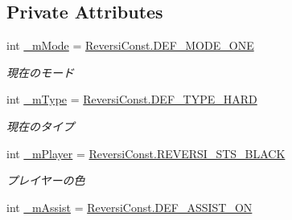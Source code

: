 \subsection*{Private Attributes}
\begin{DoxyCompactItemize}
\item 
\mbox{\label{class_reversi_form_1_1_reversi_setting_a054880d4b6b1dc2e0432d82671041c19}} 
int \hyperlink{class_reversi_form_1_1_reversi_setting_a054880d4b6b1dc2e0432d82671041c19}{\+\_\+m\+Mode} = \hyperlink{class_reversi_form_1_1_reversi_const_a1435eab18ee3e90aaaf9ec5f1efb2d90}{Reversi\+Const.\+D\+E\+F\+\_\+\+M\+O\+D\+E\+\_\+\+O\+NE}
\begin{DoxyCompactList}\small\item\em 現在のモード \end{DoxyCompactList}\item 
\mbox{\label{class_reversi_form_1_1_reversi_setting_aa8eef2266d0a796df74c94ddd7ab7e0a}} 
int \hyperlink{class_reversi_form_1_1_reversi_setting_aa8eef2266d0a796df74c94ddd7ab7e0a}{\+\_\+m\+Type} = \hyperlink{class_reversi_form_1_1_reversi_const_a1fc6c096ed7bf9c9401899dc60bb5fb3}{Reversi\+Const.\+D\+E\+F\+\_\+\+T\+Y\+P\+E\+\_\+\+H\+A\+RD}
\begin{DoxyCompactList}\small\item\em 現在のタイプ \end{DoxyCompactList}\item 
\mbox{\label{class_reversi_form_1_1_reversi_setting_aefd0cb09a3fb25ac736bbedc0f48c3fb}} 
int \hyperlink{class_reversi_form_1_1_reversi_setting_aefd0cb09a3fb25ac736bbedc0f48c3fb}{\+\_\+m\+Player} = \hyperlink{class_reversi_form_1_1_reversi_const_a19368037d4ce0d7c6928945a20458866}{Reversi\+Const.\+R\+E\+V\+E\+R\+S\+I\+\_\+\+S\+T\+S\+\_\+\+B\+L\+A\+CK}
\begin{DoxyCompactList}\small\item\em プレイヤーの色 \end{DoxyCompactList}\item 
\mbox{\label{class_reversi_form_1_1_reversi_setting_a646a2281b1a5bbb9701233c9af3aa36b}} 
int \hyperlink{class_reversi_form_1_1_reversi_setting_a646a2281b1a5bbb9701233c9af3aa36b}{\+\_\+m\+Assist} = \hyperlink{class_reversi_form_1_1_reversi_const_a1eb1013bd4ea0a96dd634dd602003e33}{Reversi\+Const.\+D\+E\+F\+\_\+\+A\+S\+S\+I\+S\+T\+\_\+\+ON}

\end{DoxyCompactItemize}
